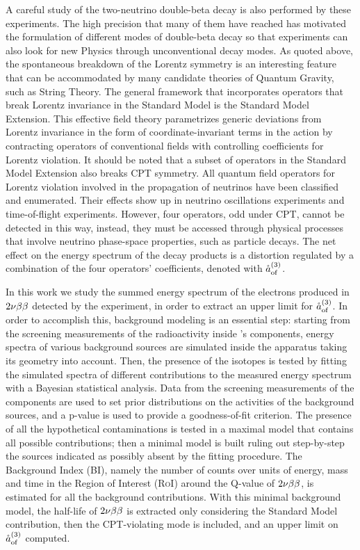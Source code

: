 	A careful study of the two-neutrino double-beta decay is also performed by these experiments. The high precision that many of them have reached has motivated the formulation of different modes of double-beta decay so that experiments can also look for new Physics through unconventional decay modes. As quoted above, the spontaneous breakdown of the Lorentz symmetry is an interesting feature that can be accommodated by many candidate theories of Quantum Gravity, such as String Theory. The general framework that incorporates operators that break Lorentz invariance in the Standard Model is the Standard Model Extension. This effective field theory parametrizes generic deviations from Lorentz invariance in the form of coordinate-invariant terms in the action by contracting operators of conventional fields with controlling coefficients for Lorentz violation. It should be noted that a subset of operators in the Standard Model Extension also breaks CPT symmetry. All quantum field operators for Lorentz violation involved in the propagation of neutrinos have been classified and enumerated. Their effects show up in neutrino oscillations experiments and time-of-flight experiments. However, four operators, odd under CPT, cannot be detected in this way, instead, they must be accessed through physical processes that involve neutrino phase-space properties, such as particle decays. The net effect on the energy spectrum of the decay products is a distortion regulated by a combination of the four operators' coefficients, denoted with $\mathring{a}_\text{of}^{(3)}$.

	In this work we study the summed energy spectrum of the electrons produced in $2\nu\beta\beta$ detected by the {\gerda} experiment, in order to extract an upper limit for $\mathring{a}_\text{of}^{(3)}$. In order to accomplish this, background modeling is an essential step: starting from the screening measurements of the radioactivity inside {\gerda}’s components, energy spectra of various background sources are simulated inside the apparatus taking its geometry into account. Then, the presence of the isotopes is tested by fitting the simulated spectra of different contributions to the measured energy spectrum with a Bayesian statistical analysis. Data from the screening measurements of the {\gerda} components are used to set prior distributions on the activities of the background sources, and a p-value is used to provide a goodness-of-fit criterion. The presence of all the hypothetical contaminations is tested in a maximal model that contains all possible contributions; then a minimal model is built ruling out step-by-step the sources indicated as possibly absent by the fitting procedure. The Background Index (BI), namely the number of counts over units of energy, mass and time in the Region of Interest (\textsc{RoI}) around the Q-value of $2\nu\beta\beta$, is estimated for all the background contributions. With this minimal background model, the half-life of $2\nu\beta\beta$ is extracted only considering the Standard Model contribution, then the CPT-violating mode is included, and an upper limit on $\mathring{a}_\text{of}^{(3)}$ computed.

